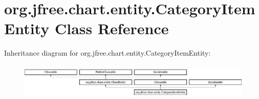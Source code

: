 \hypertarget{classorg_1_1jfree_1_1chart_1_1entity_1_1_category_item_entity}{}\section{org.\+jfree.\+chart.\+entity.\+Category\+Item\+Entity Class Reference}
\label{classorg_1_1jfree_1_1chart_1_1entity_1_1_category_item_entity}
Inheritance diagram for org.\+jfree.\+chart.\+entity.\+Category\+Item\+Entity\+:\begin{figure}[H]
\begin{center}
\leavevmode
\includegraphics[height=1.714286cm]{classorg_1_1jfree_1_1chart_1_1entity_1_1_category_item_entity}
\end{center}
\end{figure}
